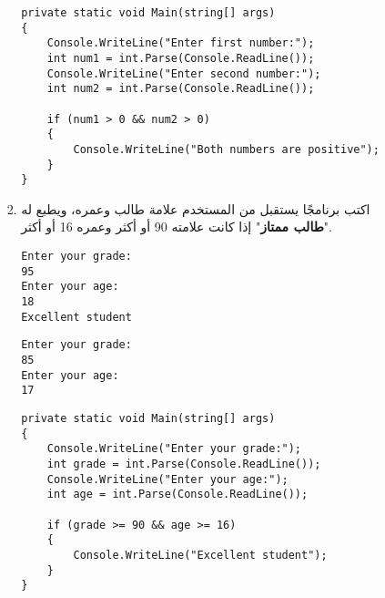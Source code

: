 \documentclass[12pt]{article}
\begin{document}
\begin{enumerate}[itemsep=3em]
\begin{enumerate}[itemsep=3em]
\begin{enumerate}[itemsep=3em]
\begin{enumerate}
\ifwithsols
\begin{solution}
\begin{english}
\begin{lstlisting}
private static void Main(string[] args)
{
    Console.WriteLine("Enter first number:");
    int num1 = int.Parse(Console.ReadLine());
    Console.WriteLine("Enter second number:");
    int num2 = int.Parse(Console.ReadLine());

    if (num1 > 0 && num2 > 0)
    {
        Console.WriteLine("Both numbers are positive");
    }
}
\end{lstlisting}
\end{english}
\end{solution}
\clearpage
\fi
\fi

\item
اكتب برنامجًا يستقبل من المستخدم علامة طالب وعمره، ويطبع له "\textbf{طالب ممتاز}" إذا كانت علامته 90 أو أكثر وعمره 16 أو أكثر.
\ifdetailed
\begin{example}[1]
\begin{english}
\begin{lstlisting}
Enter your grade:
95
Enter your age:
18
Excellent student
\end{lstlisting}
\end{english}
\end{example}
\begin{example}[2]
\begin{english}
\begin{lstlisting}
Enter your grade:
85
Enter your age:
17
\end{lstlisting}
\end{english}
\end{example}

\ifwithsols
\begin{solution}
\begin{english}
\begin{lstlisting}
private static void Main(string[] args)
{
    Console.WriteLine("Enter your grade:");
    int grade = int.Parse(Console.ReadLine());
    Console.WriteLine("Enter your age:");
    int age = int.Parse(Console.ReadLine());

    if (grade >= 90 && age >= 16)
    {
        Console.WriteLine("Excellent student");
    }
}
\end{lstlisting}
\end{english}
\end{solution}
\clearpage
\fi
\fi

\end{enumerate}


\end{enumerate}
\end{enumerate}
\end{enumerate}
\end{document}
